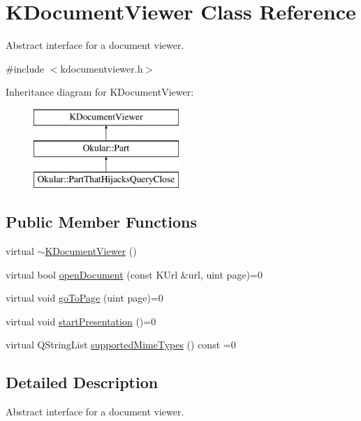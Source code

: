 \hypertarget{classKDocumentViewer}{\section{K\+Document\+Viewer Class Reference}
\label{classKDocumentViewer}
}


Abstract interface for a document viewer.  




{\ttfamily \#include $<$kdocumentviewer.\+h$>$}

Inheritance diagram for K\+Document\+Viewer\+:\begin{figure}[H]
\begin{center}
\leavevmode
\includegraphics[height=3.000000cm]{classKDocumentViewer}
\end{center}
\end{figure}
\subsection*{Public Member Functions}
\begin{DoxyCompactItemize}
\item 
virtual \hyperlink{classKDocumentViewer_a0328144f5466f7537ca279275f05a1d2}{$\sim$\+K\+Document\+Viewer} ()
\item 
virtual bool \hyperlink{classKDocumentViewer_ab34a54884eb18571652b18d99ded1206}{open\+Document} (const K\+Url \&url, uint page)=0
\item 
virtual void \hyperlink{classKDocumentViewer_aaa762cb9adcdf81faca86ba1e7f65ce8}{go\+To\+Page} (uint page)=0
\item 
virtual void \hyperlink{classKDocumentViewer_a7f3293f87da2d9e25535e620612c580b}{start\+Presentation} ()=0
\item 
virtual Q\+String\+List \hyperlink{classKDocumentViewer_ad80446320a2d8c55c20d74ac69c9e344}{supported\+Mime\+Types} () const =0
\end{DoxyCompactItemize}


\subsection{Detailed Description}
Abstract interface for a document viewer. 

